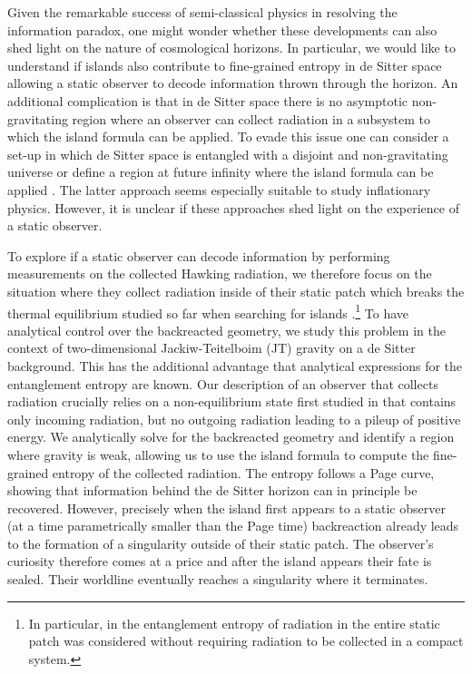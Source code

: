 \documentclass[a4paper,11pt]{article}
\numberwithin{equation}{section}
\begin{document}
Given the remarkable success of semi-classical physics in resolving the information paradox, one might wonder whether these developments can also shed light on the nature of cosmological horizons. In particular, we would like to understand if islands also contribute to fine-grained entropy in de Sitter space allowing a static observer to decode information thrown through the horizon. An additional complication is that in de Sitter space there is no asymptotic non-gravitating region where an observer can collect radiation in a subsystem to which the island formula can be applied. To evade this issue one can consider a set-up in which de Sitter space is entangled with a disjoint and non-gravitating universe or define a region at future infinity where the island formula can be applied \cite{Chen:2020tes,Hartman:2020khs,Balasubramanian:2020xqf}. The latter approach seems especially suitable to study inflationary physics. However, it is unclear if these approaches shed light on the experience of a static observer.

To explore if a static observer can decode information by performing measurements on the collected Hawking radiation, we therefore focus on the situation where they collect radiation inside of their static patch which breaks the thermal equilibrium studied so far when searching for islands \cite{Chen:2020tes,Hartman:2020khs,Balasubramanian:2020xqf,Sybesma:2020fxg,Geng:2021wcq}.\footnote{In particular, in \cite{Sybesma:2020fxg} the entanglement entropy of radiation in the entire static patch was considered without requiring radiation to be collected in a compact system.} To have analytical control over the backreacted geometry, we study this problem in the context of two-dimensional Jackiw-Teitelboim (JT) gravity on a de Sitter background. This has the additional advantage that analytical expressions for the entanglement entropy are known. Our description of an observer that collects radiation crucially relies on a non-equilibrium state first studied in \cite{Aalsma:2019rpt} that contains only incoming radiation, but no outgoing radiation leading to a pileup of positive energy. We analytically solve for the backreacted geometry and identify a region where gravity is weak, allowing us to use the island formula to compute the fine-grained entropy of the collected radiation. The entropy follows a Page curve, showing  that information behind the de Sitter horizon can in principle be recovered. However, precisely when the island first appears to a static observer (at a time parametrically smaller than the Page time) backreaction already leads to the formation of a singularity outside of their static patch. The observer's curiosity therefore comes at a price and after the island appears their fate is sealed. Their worldline eventually reaches a singularity where it terminates.
\end{document}
